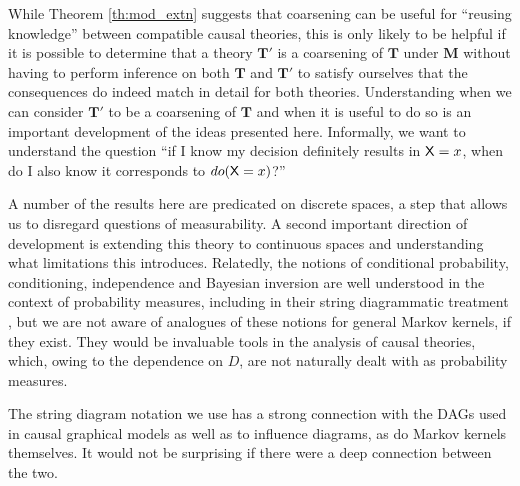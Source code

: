 While Theorem \ref{th:mod_extn} suggests that coarsening can be useful for ``reusing knowledge'' between compatible causal theories, this is only likely to be helpful if it is possible to determine that a theory $\mathbf{T}'$ is a coarsening of $\mathbf{T}$ under $\mathbf{M}$ without having to perform inference on both $\mathbf{T}$ and $\mathbf{T}'$ to satisfy ourselves that the consequences do indeed match in detail for both theories. Understanding when we can consider $\mathbf{T}'$ to be a coarsening of $\mathbf{T}$ and when it is useful to do so is an important development of the ideas presented here. Informally, we want to understand the question ``if I know my decision definitely results in $\mathsf{X}=x$, when do I also know it corresponds to $do(\mathsf{X}=x)$?''

A number of the results here are predicated on discrete spaces, a step that allows us to disregard questions of measurability. A second important direction of development is extending this theory to continuous spaces and understanding what limitations this introduces. Relatedly, the notions of conditional probability, conditioning, independence and Bayesian inversion are well understood in the context of probability measures, including in their string diagrammatic treatment \citep{cho_disintegration_2019}, but we are not aware of analogues of these notions for general Markov kernels, if they exist. They would be invaluable tools in the analysis of causal theories, which, owing to the dependence on $D$, are not naturally dealt with as probability measures.

The string diagram notation we use has a strong connection with the DAGs \citep{fong_causal_2013} used in causal graphical models as well as to influence diagrams\citep{dawid_influence_2002}, as do Markov kernels themselves. It would not be surprising if there were a deep connection between the two. 

